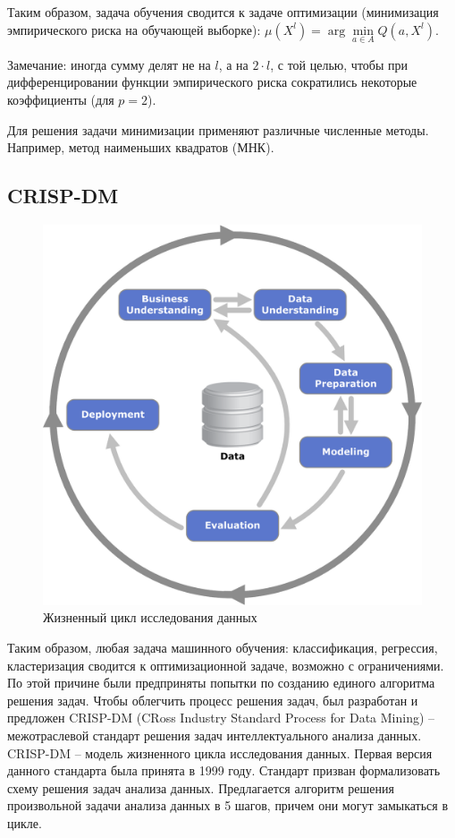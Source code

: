 Таким образом, задача обучения сводится к задаче оптимизации (минимизация эмпирического риска на обучающей выборке): $\mu(X^l) = \arg\min\limits_{a \in A} Q(a,X^l)$.

Замечание: иногда сумму делят не на $l$, а на $2 \cdot l$, с той целью, чтобы при дифференцировании функции эмпирического риска сократились некоторые коэффициенты (для $p=2$).

Для решения задачи минимизации применяют различные численные методы. Например, метод наименьших квадратов (МНК).


\subsection{CRISP-DM}

\begin{figure} 
    \vspace{-2ex}
    \includegraphics[width=\linewidth]{src/img/CRISP-DM_process_diagram.png}
    \caption{Жизненный цикл исследования данных \cite{wiki:crisp_dm}}
    \label{fig:crisp_dm}
\end{figure}

Таким образом, любая задача машинного обучения: классификация, регрессия, кластеризация сводится к оптимизационной задаче, возможно с ограничениями. По этой причине были предприняты попытки по созданию единого алгоритма решения задач. Чтобы облегчить процесс решения задач, был разработан и предложен CRISP-DM (CRoss Industry Standard Process for Data Mining) -- межотраслевой стандарт решения задач интеллектуального анализа данных. CRISP-DM -- модель жизненного цикла исследования данных.
Первая версия данного стандарта была принята в 1999 году. Стандарт призван формализовать схему решения задач анализа данных. Предлагается алгоритм решения произвольной задачи анализа данных в 5 шагов, причем они могут замыкаться в цикле.

